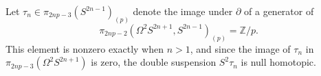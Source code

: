 Let $\tau_n \in \pi_{2np-3}(S^{2n-1})_{(p)}$ denote the image under $\partial$ of a generator of
$$\pi_{2np-2}(\Omega^2 S^{2n+1}, S^{2n-1})_{(p)} = \mathbb{Z}/p.$$
This element is nonzero exactly when $n > 1$, and since the image of $\tau_n$ in $\pi_{2np-3}(\Omega^2 S^{2n+1})$ is zero, the double suspension $S^2\tau_n$ is null homotopic.

